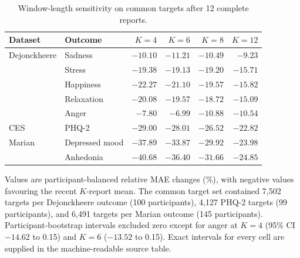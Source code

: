 \documentclass[pdflatex,sn-vancouver-num]{sn-jnl}
\begin{document}
\begin{table}[!htbp]
\caption{Window-length sensitivity on common targets after 12 complete reports.}\label{tab:s13}
\centering\small
\begin{tabular}{@{}llrrrr@{}}
\toprule
Dataset & Outcome & $K=4$ & $K=6$ & $K=8$ & $K=12$\\
\midrule
Dejonckheere & Sadness & $-10.10$ & $-11.21$ & $-10.49$ & $-9.23$\\
 & Stress & $-19.38$ & $-19.13$ & $-19.20$ & $-15.71$\\
 & Happiness & $-22.27$ & $-21.10$ & $-19.57$ & $-15.82$\\
 & Relaxation & $-20.08$ & $-19.57$ & $-18.72$ & $-15.09$\\
 & Anger & $-7.80$ & $-6.99$ & $-10.88$ & $-10.54$\\
CES & PHQ-2 & $-29.00$ & $-28.01$ & $-26.52$ & $-22.82$\\
Marian & Depressed mood & $-37.89$ & $-33.87$ & $-29.92$ & $-23.98$\\
 & Anhedonia & $-40.68$ & $-36.40$ & $-31.66$ & $-24.85$\\
\bottomrule
\end{tabular}
\begin{flushleft}\footnotesize Values are participant-balanced relative MAE changes (\%), with negative values favouring the recent $K$-report mean. The common target set contained 7,502 targets per Dejonckheere outcome (100 participants), 4,127 PHQ-2 targets (99 participants), and 6,491 targets per Marian outcome (145 participants). Participant-bootstrap intervals excluded zero except for anger at $K=4$ (95\% CI $-14.62$ to 0.15) and $K=6$ ($-13.52$ to 0.15). Exact intervals for every cell are supplied in the machine-readable source table.\end{flushleft}
\end{table}
\end{document}
